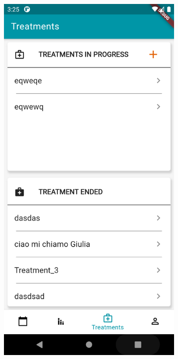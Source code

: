 \documentclass [12pt]{article}
\begin{document}
\begin{description}[leftmargin=1cm,rightmargin=1cm]
\item [ 6)Visualize treatments]
\
\
\
\begin{figure}[h!]
\centering
\hspace*{\fill}
\begin{subfigure}[tl]{0.3\linewidth}
\includegraphics[width=\linewidth]{treatments1.PNG}

\end{subfigure}
\end{figure}
\end{description}
\end{document}
